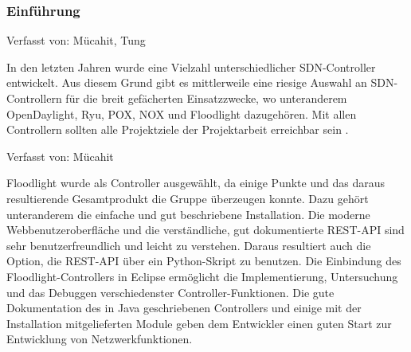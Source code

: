 \documentclass[fontsize=12pt,paper=a4,open=any,parskip=half,
  twoside=false,toc=listof,toc=bibliography,fleqn,leqno,
  captions=nooneline,captions=tableabove,british]{scrbook}
\begin{document}
\subsubsection{Einführung}
{\tiny Verfasst von: Mücahit, Tung\par}
In den letzten Jahren wurde eine Vielzahl unterschiedlicher SDN-Controller entwickelt. Aus diesem Grund gibt es mittlerweile eine riesige Auswahl an SDN-Controllern für die breit gefächerten Einsatzzwecke, wo unteranderem OpenDaylight, Ryu, POX, NOX und Floodlight dazugehören. Mit allen Controllern sollten alle Projektziele der Projektarbeit erreichbar sein \cite{controllers}.\par
{\tiny Verfasst von: Mücahit\par}
Floodlight wurde als Controller ausgewählt, da einige Punkte und das daraus resultierende Gesamtprodukt die Gruppe überzeugen konnte. Dazu gehört unteranderem die einfache und gut beschriebene Installation. Die moderne Webbenutzeroberfläche und die verständliche, gut dokumentierte REST-API sind sehr benutzerfreundlich und leicht zu verstehen. Daraus resultiert auch die Option, die REST-API über ein Python-Skript zu benutzen. Die Einbindung des Floodlight-Controllers in Eclipse ermöglicht die Implementierung, Untersuchung und das Debuggen verschiedenster Controller-Funktionen. Die gute Dokumentation des in Java geschriebenen Controllers und einige mit der Installation mitgelieferten Module geben dem Entwickler einen guten Start zur Entwicklung von Netzwerkfunktionen.
\end{document}

